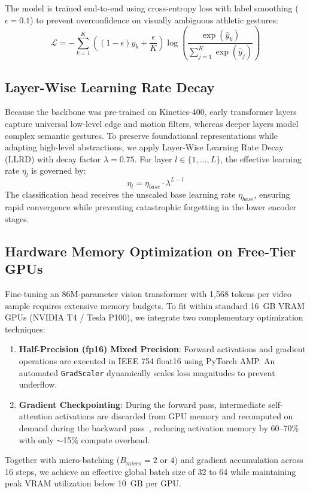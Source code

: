The model is trained end-to-end using cross-entropy loss with label smoothing ($\epsilon=0.1$) to prevent overconfidence on visually ambiguous athletic gestures:
\begin{equation}
\mathcal{L} = -\sum_{k=1}^{K} \left( (1 - \epsilon) y_k + \frac{\epsilon}{K} \right) \log \left( \frac{\exp(\hat{y}_k)}{\sum_{j=1}^{K} \exp(\hat{y}_j)} \right)
\end{equation}

\subsection{Layer-Wise Learning Rate Decay}
Because the backbone was pre-trained on Kinetics-400, early transformer layers capture universal low-level edge and motion filters, whereas deeper layers model complex semantic gestures. To preserve foundational representations while adapting high-level abstractions, we apply Layer-Wise Learning Rate Decay (LLRD) with decay factor $\lambda = 0.75$. For layer $l \in \{1, \dots, L\}$, the effective learning rate $\eta_l$ is governed by:
\begin{equation}
\eta_l = \eta_{base} \cdot \lambda^{L - l}
\end{equation}
The classification head receives the unscaled base learning rate $\eta_{base}$, ensuring rapid convergence while preventing catastrophic forgetting in the lower encoder stages.

\subsection{Hardware Memory Optimization on Free-Tier GPUs}
Fine-tuning an 86M-parameter vision transformer with 1,568 tokens per video sample requires extensive memory budgets. To fit within standard 16~GB VRAM GPUs (NVIDIA T4 / Tesla P100), we integrate two complementary optimization techniques:
\begin{enumerate}
    \item \textbf{Half-Precision (fp16) Mixed Precision}: Forward activations and gradient operations are executed in IEEE 754 float16 using PyTorch AMP. An automated \texttt{GradScaler} dynamically scales loss magnitudes to prevent underflow.
    \item \textbf{Gradient Checkpointing}: During the forward pass, intermediate self-attention activations are discarded from GPU memory and recomputed on demand during the backward pass~\cite{chen2016training}, reducing activation memory by 60--70\% with only $\sim$15\% compute overhead.
\end{enumerate}
Together with micro-batching ($B_{micro}=2$ or $4$) and gradient accumulation across 16 steps, we achieve an effective global batch size of 32 to 64 while maintaining peak VRAM utilization below 10~GB per GPU.
